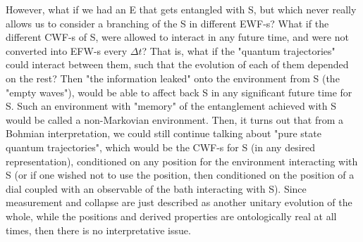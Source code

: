 \documentclass[11pt, a4paper]{article} %
\begin{document}

However, what if we had an E that gets entangled with S, but which never really allows us to consider a branching of the S in different EWF-s? What if the different CWF-s of S, were allowed to interact in any future time, and were not converted into EFW-s every $\Delta t$? That is, what if the "quantum trajectories" could interact between them, such that the evolution of each of them depended on the rest? Then "the information leaked" onto the environment from S (the "empty waves"), would be able to affect back S in any significant future time for S. Such an environment with "memory" of the entanglement achieved with S would be called a non-Markovian environment. Then, it turns out that from a Bohmian interpretation, we could still continue talking about "pure state quantum trajectories", which would be the CWF-s for S (in any desired representation), conditioned on any position for the environment interacting with S (or if one wished not to use the position, then conditioned on the position of a dial coupled with an observable of the bath interacting with S). Since measurement and collapse are just described as another unitary evolution of the whole, while the positions and derived properties are ontologically real at all times, then there is no interpretative issue.
\end{document}
